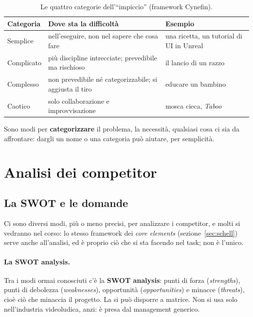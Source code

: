 \begin{table}[htbp]
  \centering
  \caption{Le quattro categorie dell'``impiccio'' (framework Cynefin).}
  \label{tab:cynefin}
  \begin{tabular}{@{}p{}p{}p{}@{}}
    \toprule
    \textbf{Categoria} & \textbf{Dove sta la difficoltà} & \textbf{Esempio} \\
    \midrule
    Semplice & nell'eseguire, non nel sapere che cosa fare & una ricetta, un
      tutorial di UI in Unreal \\
    Complicato & più discipline intrecciate; prevedibile ma rischioso & il lancio
      di un razzo \\
    Complesso & non prevedibile né categorizzabile; si aggiusta il tiro &
      educare un bambino \\
    Caotico & solo collaborazione e improvvisazione & mosca cieca,
      \emph{Taboo} \\
    \bottomrule
  \end{tabular}
\end{table}

Sono modi per \textbf{categorizzare} il problema, la necessità, qualsiasi cosa
ci sia da affrontare: dargli un nome o una categoria può aiutare, per
semplicità.

\section{Analisi dei competitor}
\label{sec:analisi-competitor}



\subsection{La SWOT e le domande}

Ci sono diversi modi, più o meno precisi, per analizzare i competitor, e
molti si vedranno nel corso: lo stesso framework dei \emph{core elements}
(sezione~\ref{sec:schell}) serve anche all'analisi, ed è proprio ciò che si
sta facendo nel task; non è l'unico.

\paragraph{La SWOT analysis.} Tra i modi ormai conosciuti c'è la
\textbf{SWOT analysis}: punti di forza (\emph{strengths}), punti di
debolezza (\emph{weaknesses}), opportunità (\emph{opportunities}) e minacce
(\emph{threats}), cioè ciò che minaccia il progetto. La si può disporre a
matrice. Non si usa solo nell'industria videoludica, anzi: è presa dal
management generico.

